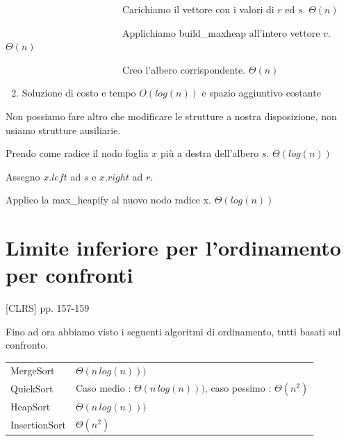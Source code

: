 \documentclass[tikz]{article}
\providecommand{\tightlist}{%
  \setlength{\itemsep}{0pt}\setlength{\parskip}{0pt}}
\begin{document}
{~~~~~~~~~~~~~~~~~~~~~~~~Carichiamo il vettore con i valori di $r$ ed $s$. $\Theta(n)$}

{~~~~~~~~~~~~~~~~~~~~~~~~Applichiamo build\_maxheap all'intero vettore $v$. $\Theta(n)$}

{~~~~~~~~~~~~~~~~~~~~~~~~Creo l'albero corrispondente. $\Theta(n)$}

\begin{enumerate}
\setcounter{enumi}{1}
\tightlist
\item
  {Soluzione di costo e tempo $O(log(n))$ e spazio aggiuntivo costante}
\end{enumerate}

{Non possiamo fare altro che modificare le strutture a nostra disposizione, non usiamo strutture ausiliarie.}

{Prendo come radice il nodo foglia $x$ più a destra dell'albero $s$. $\Theta(log(n))$}

{Assegno $x.left$ ad $s$ e $x.right$ ad $r$.}

{Applico la max\_heapify al nuovo nodo radice x. $\Theta(log(n))$}


\section{Limite inferiore per l'ordinamento per confronti}

{{[}CLRS{]} pp. 157-159}

{Fino ad ora abbiamo visto i seguenti algoritmi di ordinamento, tutti basati sul confronto.}

\begin{longtable}[]{@{}ll@{}}
\toprule
\begin{minipage}[t]{0.47\columnwidth}\raggedright\strut
{MergeSort}\strut
\end{minipage} & \begin{minipage}[t]{0.47\columnwidth}\raggedright\strut
$\Theta(n\,log(n)))$\strut
\end{minipage}\tabularnewline
\begin{minipage}[t]{0.47\columnwidth}\raggedright\strut
{QuickSort}\strut
\end{minipage} & \begin{minipage}[t]{0.47\columnwidth}\raggedright\strut
{Caso medio : $\Theta(n\,log(n)))$, caso pessimo : $\Theta(n^2)$}\strut
\end{minipage}\tabularnewline
\begin{minipage}[t]{0.47\columnwidth}\raggedright\strut
{HeapSort}\strut
\end{minipage} & \begin{minipage}[t]{0.47\columnwidth}\raggedright\strut
$\Theta(n\,log(n)))$\strut
\end{minipage}\tabularnewline
\begin{minipage}[t]{0.47\columnwidth}\raggedright\strut
{InsertionSort}\strut
\end{minipage} & \begin{minipage}[t]{0.47\columnwidth}\raggedright\strut
$\Theta(n^2)$\strut
\end{minipage}\tabularnewline
\bottomrule
\end{longtable}
\end{document}
